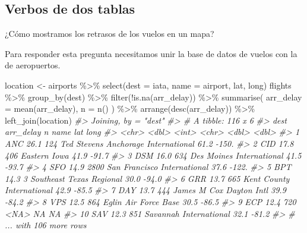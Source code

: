 \documentclass[
]{book}
\newenvironment{Shaded}{\begin{snugshade}}{\end{snugshade}}
\newcommand{\AttributeTok}[1]{\textcolor[rgb]{0.77,0.63,0.00}{#1}}
\newcommand{\CommentTok}[1]{\textcolor[rgb]{0.56,0.35,0.01}{\textit{#1}}}
\newcommand{\FunctionTok}[1]{\textcolor[rgb]{0.00,0.00,0.00}{#1}}
\newcommand{\NormalTok}[1]{#1}
\newcommand{\OtherTok}[1]{\textcolor[rgb]{0.56,0.35,0.01}{#1}}
\newcommand{\SpecialCharTok}[1]{\textcolor[rgb]{0.00,0.00,0.00}{#1}}
\begin{document}
\hypertarget{verbos-de-dos-tablas}{%
\subsection*{Verbos de dos tablas}\label{verbos-de-dos-tablas}}

¿Cómo mostramos los retrasos de los vuelos en un mapa?

Para responder esta pregunta necesitamos unir la base de datos de vuelos
con la de aeropuertos.

\begin{Shaded}
\begin{Highlighting}[]
\NormalTok{location }\OtherTok{\textless{}{-}}\NormalTok{ airports }\SpecialCharTok{\%\textgreater{}\%}
  \FunctionTok{select}\NormalTok{(}\AttributeTok{dest =}\NormalTok{ iata, }\AttributeTok{name =}\NormalTok{ airport, lat, long)}
\NormalTok{flights }\SpecialCharTok{\%\textgreater{}\%}
    \FunctionTok{group\_by}\NormalTok{(dest) }\SpecialCharTok{\%\textgreater{}\%}
    \FunctionTok{filter}\NormalTok{(}\SpecialCharTok{!}\FunctionTok{is.na}\NormalTok{(arr\_delay)) }\SpecialCharTok{\%\textgreater{}\%}
    \FunctionTok{summarise}\NormalTok{(}
        \AttributeTok{arr\_delay =} \FunctionTok{mean}\NormalTok{(arr\_delay),}
        \AttributeTok{n =} \FunctionTok{n}\NormalTok{() ) }\SpecialCharTok{\%\textgreater{}\%}
        \FunctionTok{arrange}\NormalTok{(}\FunctionTok{desc}\NormalTok{(arr\_delay)) }\SpecialCharTok{\%\textgreater{}\%}
        \FunctionTok{left\_join}\NormalTok{(location)}
\CommentTok{\#\textgreater{} Joining, by = "dest"}
\CommentTok{\#\textgreater{} \# A tibble: 116 x 6}
\CommentTok{\#\textgreater{}    dest  arr\_delay     n name                                  lat   long}
\CommentTok{\#\textgreater{}    \textless{}chr\textgreater{}     \textless{}dbl\textgreater{} \textless{}int\textgreater{} \textless{}chr\textgreater{}                               \textless{}dbl\textgreater{}  \textless{}dbl\textgreater{}}
\CommentTok{\#\textgreater{}  1 ANC        26.1   124 Ted Stevens Anchorage International  61.2 {-}150. }
\CommentTok{\#\textgreater{}  2 CID        17.8   406 Eastern Iowa                         41.9  {-}91.7}
\CommentTok{\#\textgreater{}  3 DSM        16.0   634 Des Moines International             41.5  {-}93.7}
\CommentTok{\#\textgreater{}  4 SFO        14.9  2800 San Francisco International          37.6 {-}122. }
\CommentTok{\#\textgreater{}  5 BPT        14.3     3 Southeast Texas Regional             30.0  {-}94.0}
\CommentTok{\#\textgreater{}  6 GRR        13.7   665 Kent County International            42.9  {-}85.5}
\CommentTok{\#\textgreater{}  7 DAY        13.7   444 James M Cox Dayton Intl              39.9  {-}84.2}
\CommentTok{\#\textgreater{}  8 VPS        12.5   864 Eglin Air Force Base                 30.5  {-}86.5}
\CommentTok{\#\textgreater{}  9 ECP        12.4   720 \textless{}NA\textgreater{}                                 NA     NA  }
\CommentTok{\#\textgreater{} 10 SAV        12.3   851 Savannah International               32.1  {-}81.2}
\CommentTok{\#\textgreater{} \# ... with 106 more rows}
\end{Highlighting}
\end{Shaded}
\end{document}
